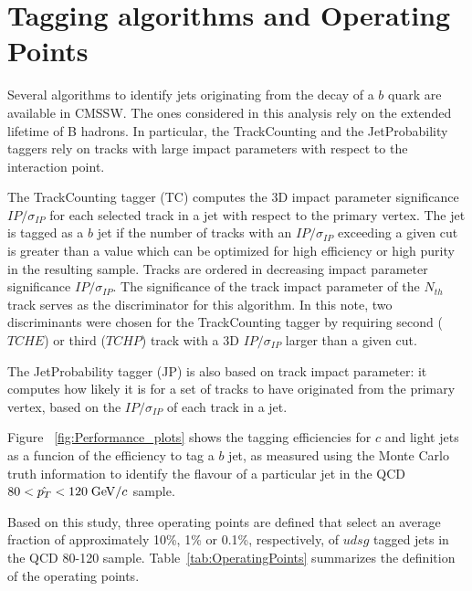 \section{Tagging algorithms and Operating Points}
\label{sec:taggingalgos}
Several algorithms to identify jets originating from 
the decay of a $b$ quark are available in CMSSW. The ones considered in this 
analysis rely on the extended lifetime of B hadrons. In particular, the 
TrackCounting and the JetProbability taggers rely on tracks with large impact 
parameters with respect to the interaction point. 

The TrackCounting tagger (TC) computes the 3D impact parameter significance 
$IP/\sigma_{IP}$ for each selected track in a jet with respect to
the primary vertex. The jet is tagged as a 
$b$ jet if the number of tracks with an $IP/\sigma_{IP}$ exceeding a given 
cut is greater than a value which can be optimized for high efficiency or
high purity in the resulting sample. Tracks are ordered in decreasing 
impact parameter significance $IP/\sigma_{IP}$. The significance of the track
impact parameter of the $N_{th} $ track serves as the discriminator for this 
algorithm.
In this note, two discriminants were chosen for the TrackCounting tagger by 
requiring second ($TCHE$) or third ($TCHP$) track with a 3D $IP/\sigma_{IP}$ 
larger than a given cut.

The JetProbability tagger (JP) is also based on track impact parameter:
it computes how likely it is for a set of tracks to have originated from the 
primary vertex, based on the $IP/\sigma_{IP}$ of each track in a jet. 

Figure ~\ref{fig:Performance_plots} shows the tagging efficiencies for $c$ and 
light jets as a funcion of the efficiency to tag a $b$ jet, as measured  
using the Monte Carlo truth information to identify the flavour of a 
particular jet in the QCD $80<\hat{p_T}<120\;{\rm GeV}/c$ sample. 

Based on this study, three operating points are defined that select 
an average fraction of approximately 10\%, 1\% or 0.1\%, 
respectively, of $udsg$ tagged jets in the QCD 80-120 sample.
Table~\ref{tab:OperatingPoints} summarizes 
the definition of the operating points.

